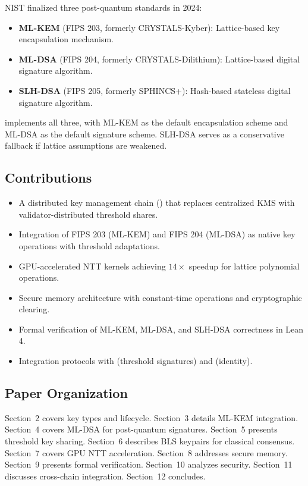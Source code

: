 NIST finalized three post-quantum standards in 2024:

\begin{itemize}
\item \textbf{ML-KEM} (FIPS 203, formerly CRYSTALS-Kyber): Lattice-based key encapsulation mechanism.
\item \textbf{ML-DSA} (FIPS 204, formerly CRYSTALS-Dilithium): Lattice-based digital signature algorithm.
\item \textbf{SLH-DSA} (FIPS 205, formerly SPHINCS+): Hash-based stateless digital signature algorithm.
\end{itemize}

\KChain{} implements all three, with ML-KEM as the default encapsulation scheme and ML-DSA as the default signature scheme. SLH-DSA serves as a conservative fallback if lattice assumptions are weakened.

\subsection{Contributions}

\begin{itemize}
\item A distributed key management chain (\KeyVM{}) that replaces centralized KMS with validator-distributed threshold shares.
\item Integration of FIPS 203 (ML-KEM) and FIPS 204 (ML-DSA) as native key operations with threshold adaptations.
\item GPU-accelerated NTT kernels achieving $14\times$ speedup for lattice polynomial operations.
\item Secure memory architecture with constant-time operations and cryptographic clearing.
\item Formal verification of ML-KEM, ML-DSA, and SLH-DSA correctness in Lean 4.
\item Integration protocols with \TChain{} (threshold signatures) and \IChain{} (identity).
\end{itemize}

\subsection{Paper Organization}

Section~2 covers key types and lifecycle. Section~3 details ML-KEM integration. Section~4 covers ML-DSA for post-quantum signatures. Section~5 presents threshold key sharing. Section~6 describes BLS keypairs for classical consensus. Section~7 covers GPU NTT acceleration. Section~8 addresses secure memory. Section~9 presents formal verification. Section~10 analyzes security. Section~11 discusses cross-chain integration. Section~12 concludes.

